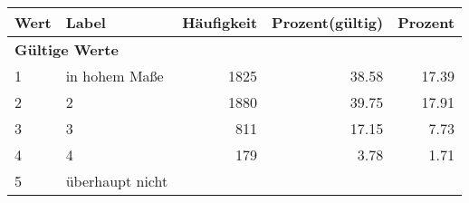      \begin{longtable}{lXrrr}
     \toprule
     \textbf{Wert} & \textbf{Label} & \textbf{Häufigkeit} & \textbf{Prozent(gültig)} & \textbf{Prozent} \\
     \endhead
     \midrule
     \multicolumn{5}{l}{\textbf{Gültige Werte}}\\

     1 &
     \multicolumn{1}{X}{ in hohem Maße   } &


       \num{1825} &
       \num[round-mode=places,round-precision=2]{38.58} &
         \num[round-mode=places,round-precision=2]{17.39} \\

     2 &
     \multicolumn{1}{X}{ 2   } &


       \num{1880} &
       \num[round-mode=places,round-precision=2]{39.75} &
         \num[round-mode=places,round-precision=2]{17.91} \\

     3 &
     \multicolumn{1}{X}{ 3   } &


       \num{811} &
       \num[round-mode=places,round-precision=2]{17.15} &
         \num[round-mode=places,round-precision=2]{7.73} \\

     4 &
     \multicolumn{1}{X}{ 4   } &


       \num{179} &
       \num[round-mode=places,round-precision=2]{3.78} &
         \num[round-mode=places,round-precision=2]{1.71} \\

     5 &
     \multicolumn{1}{X}{ überhaupt nicht   } &



\end{longtable}
